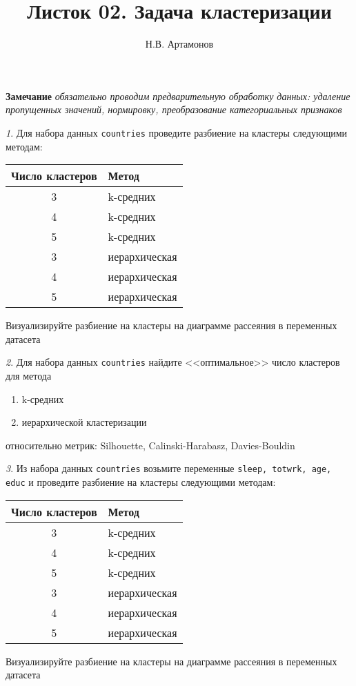 \documentclass[12pt]{article}
\title{Листок 02. Задача кластеризации}
\author{Н.В. Артамонов}
\theoremstyle{remark}
\newtheorem{exercise}{}[section]
\begin{document}
\maketitle


\textbf{Замечание} \textit{обязательно проводим предварительную обработку данных:
удаление пропущенных значений, нормировку, преобразование категориальных признаков}

\begin{exercise}
Для набора данных \texttt{countries} проведите разбиение на кластеры следующими
методам:
\begin{center}
	\begin{tabular}{c|l}
		Число кластеров & Метод \\ \hline
		3 & k-средних \\
		4 & k-средних \\
		5 & k-средних \\
		3 & иерархическая \\
		4 & иерархическая \\
		5 & иерархическая \\ \hline
	\end{tabular}
\end{center}
Визуализируйте разбиение на кластеры на диаграмме рассеяния в переменных датасета
\end{exercise}

\begin{exercise}
Для набора данных \texttt{countries} найдите <<оптимальное>> число кластеров
для метода
\begin{enumerate}
	\item k-средних
	\item иерархической кластеризации
\end{enumerate}
относительно метрик: Silhouette, Calinski-Harabasz, Davies-Bouldin
\end{exercise}

\begin{exercise}
Из набора данных \texttt{countries} возьмите переменные 
\texttt{sleep, totwrk, age, educ} и проведите разбиение на кластеры следующими
методам:
\begin{center}
	\begin{tabular}{c|l}
		Число кластеров & Метод \\ \hline
		3 & k-средних \\
		4 & k-средних \\
		5 & k-средних \\
		3 & иерархическая \\
		4 & иерархическая \\
		5 & иерархическая \\ \hline
	\end{tabular}
\end{center}
Визуализируйте разбиение на кластеры на диаграмме рассеяния в переменных датасета
\end{exercise}
	
\end{document}
